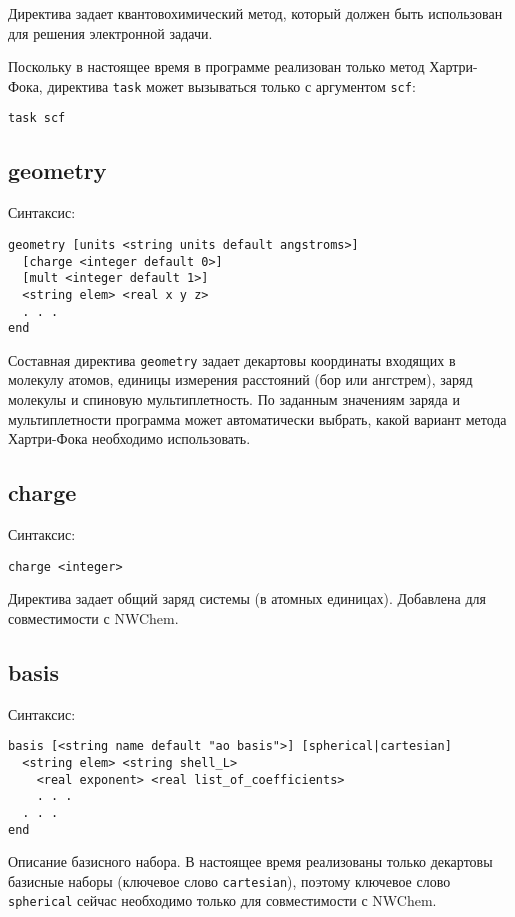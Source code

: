 \documentclass[a4paper, 12pt]{article}
\begin{document}
Директива задает квантовохимический метод, который должен быть использован для решения электронной задачи.

Поскольку в настоящее время в программе реализован только метод Хартри-Фока, директива \texttt{task} может вызываться только с аргументом \texttt{scf}:
\begin{lstlisting}
task scf
\end{lstlisting}

\subsection{geometry}

Синтаксис:

\begin{lstlisting}
geometry [units <string units default angstroms>]
  [charge <integer default 0>]
  [mult <integer default 1>]
  <string elem> <real x y z>
  . . .
end
\end{lstlisting}

Составная директива \texttt{geometry} задает декартовы координаты входящих в молекулу атомов, единицы измерения расстояний (бор или ангстрем), заряд молекулы и спиновую мультиплетность. По заданным значениям заряда и мультиплетности программа может автоматически выбрать, какой вариант метода Хартри-Фока необходимо использовать.

\subsection{charge}
Синтаксис:

\begin{lstlisting}
charge <integer>
\end{lstlisting}

Директива задает общий заряд системы (в атомных единицах). Добавлена для совместимости с NWChem.

\subsection{basis}

Синтаксис:

\begin{lstlisting}
basis [<string name default "ao basis">] [spherical|cartesian]
  <string elem> <string shell_L>
    <real exponent> <real list_of_coefficients>
    . . .
  . . .
end
\end{lstlisting}

Описание базисного набора. В настоящее время реализованы только декартовы базисные наборы (ключевое слово \texttt{cartesian}), поэтому ключевое слово \texttt{spherical} сейчас необходимо только для совместимости с NWChem.
\end{document}
